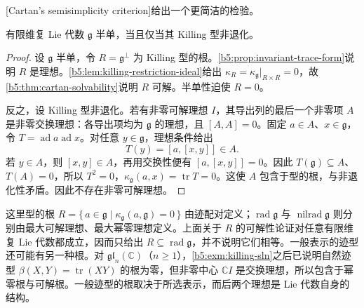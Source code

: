 [Cartan's semisimplicity criterion]给出一个更简洁的检验。

\begin{theorem}\label{b5:thm:killing-semisimple}
	有限维复 Lie 代数 \(\mathfrak g\) 半单，当且仅当其 Killing 型非退化。
\end{theorem}
\begin{proof}
	设 \(\mathfrak g\) 半单，令 \(R=\mathfrak g^\perp\) 为 Killing 型的根。\cref{b5:prop:invariant-trace-form}说明 \(R\) 是理想。\cref{b5:lem:killing-restriction-ideal}给出 \(\kappa_R=\kappa_{\mathfrak g}|_{R\times R}=0\)，故\cref{b5:thm:cartan-solvability}说明 \(R\) 可解。半单性迫使 \(R=0\)。

	反之，设 Killing 型非退化。若有非零可解理想 \(I\)，其导出列的最后一个非零项 \(A\) 是非零交换理想：各导出项均为 \(\mathfrak g\) 的理想，且 \([A,A]=0\)。固定 \(a\in A\)、\(x\in\mathfrak g\)，令 \(T=\operatorname{ad}a\operatorname{ad}x\)。对任意 \(y\in\mathfrak g\)，理想条件给出
	\[
		T(y)=[a,[x,y]]\in A.
	\]
	若 \(y\in A\)，则 \([x,y]\in A\)，再用交换性便有 \([a,[x,y]]=0\)。因此 \(T(\mathfrak g)\subseteq A\)、\(T(A)=0\)，所以 \(T^2=0\)，\(\kappa_{\mathfrak g}(a,x)=\operatorname{tr}T=0\)。这使 \(A\) 包含于型的根，与非退化性矛盾。因此不存在非零可解理想。
\end{proof}

这里型的根 \(R=\{\,a\in\mathfrak g\mid\kappa_{\mathfrak g}(a,\mathfrak g)=0\,\}\) 由迹配对定义；\(\operatorname{rad}\mathfrak g\) 与 \(\operatorname{nilrad}\mathfrak g\) 则分别由最大可解理想、最大幂零理想定义。上面关于 \(R\) 的可解性论证对任意有限维复 Lie 代数都成立，因而只给出 \(R\subseteq\operatorname{rad}\mathfrak g\)，并不说明它们相等。一般表示的迹型还可能有另一种根。对 \(\mathfrak{gl}_n(\mathbb C)\)（\(n\ge1\)），\cref{b5:exm:killing-sln}之后已说明自然迹型 \(\beta(X,Y)=\operatorname{tr}(XY)\) 的根为零，但非零中心 \(\mathbb CI\) 是交换理想，所以包含于幂零根与可解根。一般迹型的根取决于所选表示，而后两个理想是 Lie 代数自身的结构。


